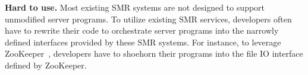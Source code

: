 \documentclass[10pt,onecolumn,letterpaper]{article}
\newcommand{\smr}[0]{SMR\xspace}
\newcommand{\zookeeper}{ZooKeeper\xspace}
\begin{document}
\begin{sloppypar}
\textbf{Hard to use.} Most existing \smr systems are not designed to 
support unmodified server programs. To utilize existing \smr services, 
developers often have to rewrite their code to orchestrate server programs into 
the narrowly defined interfaces provided by these \smr systems. For instance, 
to leverage \zookeeper~\cite{zookeeper}, developers have to shoehorn their 
programs into the file IO interface defined by \zookeeper.

\end{sloppypar}

{
 
 
}
\end{document}

